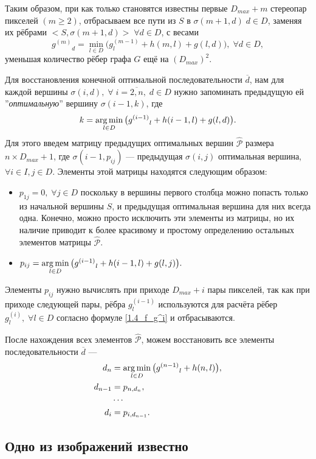 Таким образом, при как только становятся известны первые $D_{max}+m$ стереопар пикселей $( m \geqslant 2)$, отбрасываем все пути из $S$ в 
$\sigma(m+1, d) \; d \in D$, заменяя их рёбрами $<S, \sigma(m+1, d) > \; \forall d \in D$, с весами 
\begin{equation}\label{1.4_f_g^i}
{g^{(m)}}_d = \min\limits_{l \in D}{\big( g^{(m-1)}_l + h(m, l) + g(l, d) \big) },  \; \forall d \in D,
\end{equation}
уменьшая количество рёбер графа $G$ ещё на $(D_{max})^2$.
\newpage

Для восстановления конечной оптимальной последовательности $\overline{d}$, нам для каждой вершины $\sigma(i, d), \; \forall \;	i = \overline{2, n}, \; d \in D$ нужно запоминать предыдущую ей ''\textit{оптимальную}'' вершину $\sigma(i-1, k)$, где 
$$k = \operatorname*{arg\,min}\limits_{l \in D}{\big( {g^{(i-1)}}_l + h(i-1, l) + g(l, d) \big) }.$$
Для этого введем матрицу предыдущих оптимальных вершин $\hat{\mathcal{P}}$ размера \\
$n \times D_{max} + 1$, где $\sigma(i-1, p_{ij}) $ --- предыдущая $\sigma(i, j)$ оптимальная вершина, \\
$\forall i \in I, j \in D$. Элементы этой матрицы находятся следующим образом:
\begin{itemize}
\item $p_{1j} = 0, \; \forall j \in D$ поскольку в вершины первого столбца можно попасть только из начальной вершины $S$, и предыдущая оптимальная вершина для них всегда одна. Конечно, можно просто исключить эти элементы из матрицы, но их наличие приводит к более красивому и простому определению остальных элементов матрицы 
$\hat{\mathcal{P}}$.
\item $p_{ij} = \operatorname*{arg\,min}\limits_{l \in D}{\big( {g^{(i-1)}}_l + h(i-1, l) + g(l, j) \big) }.$
\end{itemize}
Элементы $p_{ij}$ нужно вычислять при приходе $D_{max} + i$ пары пикселей, так как при приходе следующей пары, рёбра $ g^{(i-1)}_l $ используются  
для расчёта рёбер $ g^{(i)}_l, \; \forall l \in D $ согласно формуле \ref{1.4_f_g^i} и отбрасываются.

После нахождения всех элементов $\hat{\mathcal{P}}$, можем восстановить все элементы последовательности $\overline{d}$ ---
\begin{align*}
d_n &= \operatorname*{arg\,min}\limits_{l \in D}  {\big( {g^{(n-1)}}_l + h(n, l) \big) }, \\
d_{n-1} &= p_{n,d_n},\\
&\cdots\\
d_i &= p_{i,d_{n-1}}.
\end{align*}



\subsection{Одно из изображений известно}

























